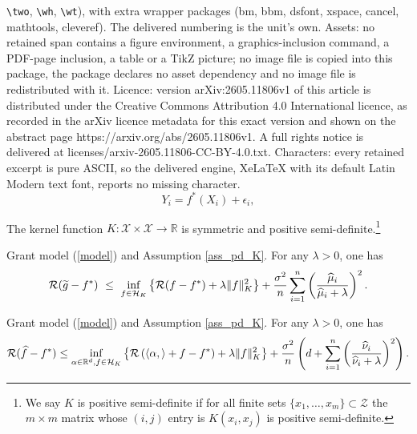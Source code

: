 \documentclass[10pt,a4paper]{amsart}
\def\RR{\mathbb{R}}
\def\cH{\mathcal H}
\def\cR{\mathcal R}
\def\cX{\mathcal{X}}
\def\cZ{\mathcal Z}
\def\l{\left}
\def\r{\right}
\def\wh{\widehat}
\def\wt{\widetilde}
\begin{document}
\texttt{\textbackslash two}, \texttt{\textbackslash wh}, \texttt{\textbackslash wt}), with extra wrapper packages (bm, bbm, dsfont, xspace, cancel, mathtools, cleveref). The delivered numbering is the unit's own. Assets: no retained span contains a figure environment, a graphics-inclusion command, a PDF-page inclusion, a table or a TikZ picture; no image file is copied into this package, the package declares no asset dependency and no image file is redistributed with it. Licence: version arXiv:2605.11806v1 of this article is distributed under the Creative Commons Attribution 4.0 International licence, as recorded in the arXiv licence metadata for this exact version and shown on the abstract page https://arxiv.org/abs/2605.11806v1. A full rights notice is delivered at licenses/arxiv-2605.11806-CC-BY-4.0.txt. Characters: every retained excerpt is pure ASCII, so the delivered engine, XeLaTeX with its default Latin Modern text font, reports no missing character.
\begin{equation}\label{model}
   Y_i=f^*(X_i)+\epsilon_i,
\end{equation}

\begin{assumption}\label{ass_pd_K}
    The kernel function $K:{ \cX \times \cX} \to \RR$ is   symmetric and positive semi-definite.\footnote{We say $K$ is positive semi-definite if for all finite sets $\{x_1,\ldots,x_m\}\subset \cZ$ the $m\times m$ matrix  whose $(i,j)$ entry is $K(x_i, x_j)$ is positive semi-definite.} 
\end{assumption}

\begin{theorem}\label{thm_krr_fix}
    Grant model (\ref{model}) and
    Assumption   \ref{ass_pd_K}.  For any $\lambda >0$, one has 
    \begin{equation}\label{rate_krr_fix}
        \cR(\wt g-f^*) ~ \le ~    \inf_{f\in \cH_K}\left\{  \cR(f-f^*) + \lambda \|f\|_K^2  \right\}+ {\sigma^2  \over n}  \sum_{i=1}^n\left(\wh \mu_i\over \wh \mu_i + \lambda\right)^2.
    \end{equation}
\end{theorem}

\begin{theorem}\label{thm_fix}
Grant model (\ref{model}) and
Assumption  \ref{ass_pd_K}. For any $\lambda >0$, one has
\begin{align}\label{bd_pred_rate_fix}
      \cR(\wh f-f^*) \le   \inf_{\alpha \in \RR^d, f\in \cH_K}\left\{  \cR\l(\langle \alpha,\rangle + f-f^*\r) +  \lambda \|f\|_K^2  \right\}+ {\sigma^2\over n}  \left(  d + \sum_{i=1}^n \left(\wh\nu_i\over \wh\nu_i + \lambda\right)^2\right).
\end{align}    
\end{theorem}
\end{document}
